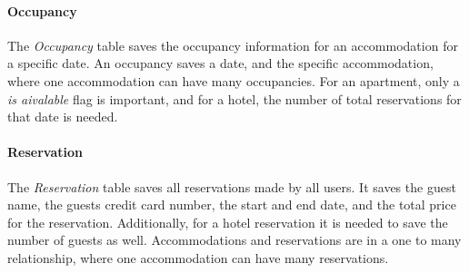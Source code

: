 \paragraph{Occupancy}
The \textit{Occupancy} table saves the occupancy information for an accommodation for a specific date. An occupancy saves a date, and the specific accommodation, where one accommodation can have many occupancies. For an apartment, only a \textit{is aivalable} flag is important, and for a hotel, the number of total reservations for that date is needed.

\paragraph{Reservation}
The \textit{Reservation} table saves all reservations made by all users. It saves the guest name, the guests credit card number, the start and end date, and the total price for the reservation. Additionally, for a hotel reservation it is needed to save the number of guests as well. Accommodations and reservations are in a one to many relationship, where one accommodation can have many reservations.

